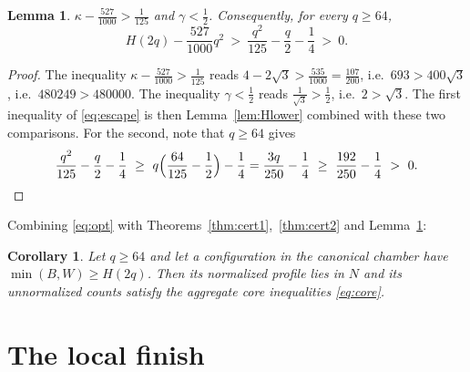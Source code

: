 \documentclass[11pt]{amsart}
\newtheorem{lemma}[theorem]{Lemma}
\newtheorem{corollary}[theorem]{Corollary}
\theoremstyle{definition}
\theoremstyle{remark}
\begin{document}
\begin{lemma}\label{lem:escape}
$\kappa-\frac{527}{1000}>\frac1{125}$ and $\gamma<\frac12$. Consequently, for every $q\ge64$,
\begin{equation}\label{eq:escape}
H(2q)-\frac{527}{1000}q^2\ >\ \frac{q^2}{125}-\frac q2-\frac14\ >\ 0 .
\end{equation}
\end{lemma}

\begin{proof}
The inequality $\kappa-\frac{527}{1000}>\frac1{125}$ reads $4-2\sqrt3>\frac{535}{1000}=\frac{107}{200}$, i.e.\ $693>400\sqrt3$, i.e.\ $480249>480000$. The inequality $\gamma<\frac12$ reads $\frac1{\sqrt3}>\frac12$, i.e.\ $2>\sqrt3$. The first inequality of \eqref{eq:escape} is then Lemma~\ref{lem:Hlower} combined with these two comparisons. For the second, note that $q\ge64$ gives
\[
\frac{q^2}{125}-\frac q2-\frac14\ \ge\ q\Bigl(\frac{64}{125}-\frac12\Bigr)-\frac14=\frac{3q}{250}-\frac14\ \ge\ \frac{192}{250}-\frac14\ >\ 0 . \qedhere
\]
\end{proof}

Combining \eqref{eq:opt} with Theorems~\ref{thm:cert1},~\ref{thm:cert2} and Lemma~\ref{lem:escape}:

\begin{corollary}\label{cor:escape}
Let $q\ge64$ and let a configuration in the canonical chamber have $\min(B,W)\ge H(2q)$. Then its normalized profile lies in $N$ and its unnormalized counts satisfy the aggregate core inequalities \eqref{eq:core}.
\end{corollary}

\section{The local finish}\label{sec:local}
\end{document}
